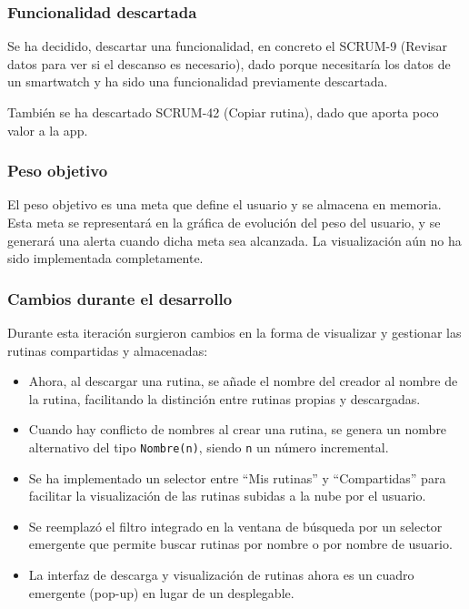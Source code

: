 \subsubsection{Funcionalidad descartada}

Se ha decidido, descartar una funcionalidad, en concreto el SCRUM-9 (Revisar datos para ver si el descanso es necesario), dado porque necesitaría los datos de un smartwatch y ha sido una funcionalidad previamente descartada.

También se ha descartado SCRUM-42 (Copiar rutina), dado que aporta poco valor a la app.

\subsubsection*{Peso objetivo}
El peso objetivo es una meta que define el usuario y se almacena en memoria. Esta meta se representar\'a en la gr\'afica de evoluci\'on del peso del usuario, y se generar\'a una alerta cuando dicha meta sea alcanzada. La visualizaci\'on a\'un no ha sido implementada completamente.

\subsubsection*{Cambios durante el desarrollo}
Durante esta iteraci\'on surgieron cambios en la forma de visualizar y gestionar las rutinas compartidas y almacenadas:

\begin{itemize}
  \item Ahora, al descargar una rutina, se a\~nade el nombre del creador al nombre de la rutina, facilitando la distinci\'on entre rutinas propias y descargadas.
  \item Cuando hay conflicto de nombres al crear una rutina, se genera un nombre alternativo del tipo \texttt{Nombre(n)}, siendo \texttt{n} un n\'umero incremental.
  \item Se ha implementado un selector entre ``Mis rutinas'' y ``Compartidas'' para facilitar la visualizaci\'on de las rutinas subidas a la nube por el usuario.
  \item Se reemplaz\'o el filtro integrado en la ventana de b\'usqueda por un selector emergente que permite buscar rutinas por nombre o por nombre de usuario.
  \item La interfaz de descarga y visualizaci\'on de rutinas ahora es un cuadro emergente (pop-up) en lugar de un desplegable.
\end{itemize}

